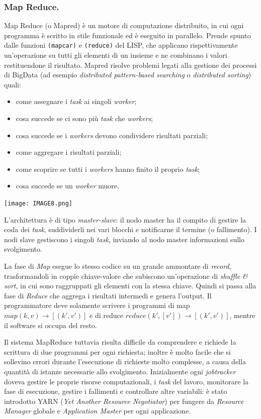 \documentclass[a4page, 11pt]{article}
\begin{document}
\subsubsection{Map Reduce.}
Map Reduce (o Mapred) è un motore di computazione distribuito, in cui ogni programma è scritto in stile funzionale ed è eseguito in parallelo.
Prende spunto dalle funzioni \verb|(mapcar)| e \verb|(reduce)| del LISP, che applicano rispettivamente un'operazione su tutti gli elementi di un insieme e ne combinano i valori restituendone il risultato.
Mapred risolve problemi legati alla gestione dei processi di BigData (ad esempio \textit{distributed pattern-based searching} o \textit{distributed sorting}) quali:
\begin{itemize}
\item come assegnare i \textit{task} ai singoli \textit{worker};
\item cosa succede se ci sono più \textit{task} che \textit{workers};
\item cosa succede se i \textit{workers} devono condividere risultati parziali;
\item come aggregare i risultati parziali;
\item come scoprire se tutti i \textit{workers} hanno finito il proprio \textit{task};
\item cosa succede se un \textit{worker} muore.
\end{itemize}
\begin{center}
  \texttt{[image: IMAGE8.png]}
\end{center}

L'architettura è di tipo \textit{master-slave}: il nodo master ha il compito di gestire la coda dei \textit{task}, suddividerli nei vari blocchi e notificarne il termine (o fallimento).
I nodi slave gestiscono i singoli \textit{task}, inviando al nodo master informazioni sullo svolgimento.

La fase di \textit{Map} esegue lo stesso codice su un grande ammontare di \textit{record}, trasformandoli in coppie chiave-valore che subiscono un'operazione di \textit{shuffle \& sort}, in cui sono raggruppati gli elementi con la stessa chiave.
Quindi si passa alla fase di \textit{Reduce} che aggrega i risultati intermedi e genera l'output.
Il programmatore deve solamente scrivere i programmi di map $map (k, v) \rightarrow [(k', v')]$ e di reduce $reduce (k', [v']) \rightarrow [(k', v')]$, mentre il software si occupa del resto.

Il sistema MapReduce tuttavia risulta difficile da comprendere e richiede la scrittura di due programmi per ogni richiesta; inoltre è molto facile che si sollevino errori durante l'esecuzione di richieste molto complesse, a causa della quantità di istanze necessarie allo svolgimento.
Inizialmente ogni \textit{jobtracker} doveva gestire le proprie risorse computazionali, i \textit{task} del lavoro, monitorare la fase di esecuzione, gestire i fallimenti e controllare altre variabili: è stato introdotto YARN (\textit{Yet Another Resource Negotiator}) per fungere da \textit{Resource Manager} globale e \textit{Application Master} per ogni applicazione.
\end{document}
